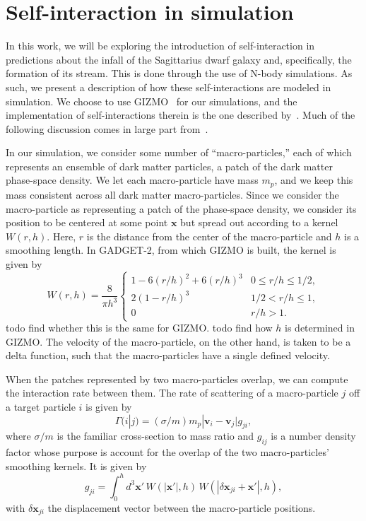\hypertarget{self-interaction-in-simulation}{%
\section{Self-interaction in simulation}\label{self-interaction-in-simulation}}

In this work, we will be exploring the introduction of self-interaction in
predictions about the infall of the Sagittarius dwarf galaxy and,
specifically, the formation of its stream. This is done through the use of
N-body simulations. As such, we present a description of how these
self-interactions are modeled in simulation. We choose to use
GIZMO~\cite{hopkins_new_2015} for our simulations, and the implementation of
self-interactions therein is the one described
by~\cite{rocha_cosmological_2013}. Much of the following discussion comes in
large part from~\cite{rocha_cosmological_2013}.

In our simulation, we consider some number of ``macro-particles,'' each
of which represents an ensemble of dark matter particles, a patch of the
dark matter phase-space density. We let each macro-particle have mass
\(m_p\), and we keep this mass consistent across all dark matter
macro-particles. Since we consider the macro-particle as representing a
patch of the phase-space density, we consider its position to be
centered at some point \(\mathbf{x}\) but spread out according to a
kernel \(W(r,h)\). Here, \(r\) is the distance from the center of the
macro-particle and \(h\) is a smoothing length. In GADGET-2, from which
GIZMO is built, the kernel is given by 
\begin{equation}
W(r,h) = \frac{8}{\pi h^3} \left\{ 
    \begin{array}{ll}
        1 - 6 (r/h)^2 + 6 (r/h)^3 & 0 \leq r/h \leq 1/2, \\
        2 (1 - r/h)^3 & 1/2 < r/h \leq 1, \\
        0 & r/h > 1.
    \end{array}
\right.
\end{equation}
todo find whether this is the same for GIZMO. todo find how \(h\) is
determined in GIZMO. The velocity of the macro-particle, on the other hand, is
taken to be a delta function, such that the macro-particles have a single
defined velocity.

When the patches represented by two macro-particles overlap, we can
compute the interaction rate between them. The rate of scattering of a
macro-particle \(j\) off a target particle \(i\) is given by
\begin{equation}
\Gamma(i|j) = (\sigma/m) m_p |\mathbf{v}_i - \mathbf{v}_j| g_{ji},
\end{equation}
where \(\sigma/m\) is the familiar cross-section to mass ratio and
\(g_{ij}\) is a number density factor whose purpose is account for the
overlap of the two macro-particles' smoothing kernels. It is given by
\begin{equation}
g_{ji} = \int_{0}^{h} d^3 \mathbf{x}' \, W(|\mathbf{x}'|, h) \, 
W(|\delta \mathbf{x}_{ji} + \mathbf{x}'|, h),
\end{equation}
with \(\delta \mathbf{x}_{ji}\) the displacement vector between the
macro-particle positions.

